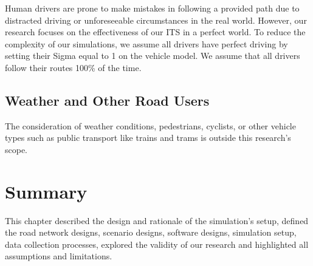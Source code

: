 Human drivers are prone to make mistakes in following a provided path due to distracted driving or unforeseeable circumstances in the real world. However, our research focuses on the effectiveness of our \acrshort{ITS} in a perfect world. To reduce the complexity of our simulations, we assume all drivers have perfect driving by setting their Sigma equal to 1 on the vehicle model.
We assume that all drivers follow their routes 100\% of the time.

\subsection{Weather and Other Road Users}

The consideration of weather conditions, pedestrians, cyclists, or other vehicle types such as public transport like trains and trams is outside this research's scope.

\section{Summary}

This chapter described the design and rationale of the simulation's setup, defined the road network designs, scenario designs, software designs, simulation setup, data collection processes, explored the validity of our research and highlighted all assumptions and limitations.